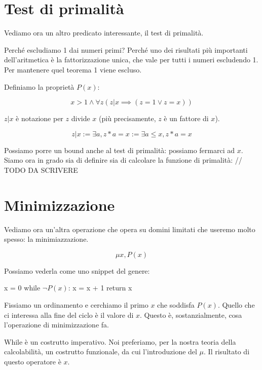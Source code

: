 \section{Test di primalità}

Vediamo ora un altro predicato interessante, il test di primalità.

Perché escludiamo 1 dai numeri primi? Perché uno dei risultati più importanti dell'aritmetica è
la fattorizzazione unica, che vale per tutti i numeri escludendo 1. Per mantenere quel teorema 1
viene escluso.

Definiamo la proprietà $P(x)$:

\begin{equation*}
    x > 1 \land \forall z (z | x \implies (z = 1 \lor z = x))
\end{equation*}

$z | x$ è notazione per $z$ divide $x$ (più precisamente, $z$ è un fattore di $x$).

\begin{equation*}
    z | x := \exists a, z * a = x := \exists a \leq x, z * a = x
\end{equation*}

Possiamo porre un bound anche al test di primalità: possiamo fermarci ad $x$. Siamo ora in grado sia di
definire sia di calcolare la funzione di primalità:
// TODO DA SCRIVERE

\section{Minimizzazione}

Vediamo ora un'altra operazione che opera su domini limitati che useremo molto spesso: la
minimiazzazione.

\begin{equation*}
    \mu x, P(x)
\end{equation*}

Possiamo vederla come uno snippet del genere:

\begin{python}
x = 0
while $\lnot P(x)$:
    x = x + 1
return x
\end{python}

Fissiamo un ordinamento e cerchiamo il primo $x$ che soddisfa $P(x)$. Quello che ci interessa alla fine
del ciclo è il valore di $x$. Questo è, sostanzialmente, cosa l'operazione di minimizzazione fa.

While è un costrutto imperativo. Noi preferiamo, per la nostra teoria della calcolabilità, un
costrutto funzionale, da cui l'introduzione del $\mu$. Il risultato di questo operatore è $x$.

